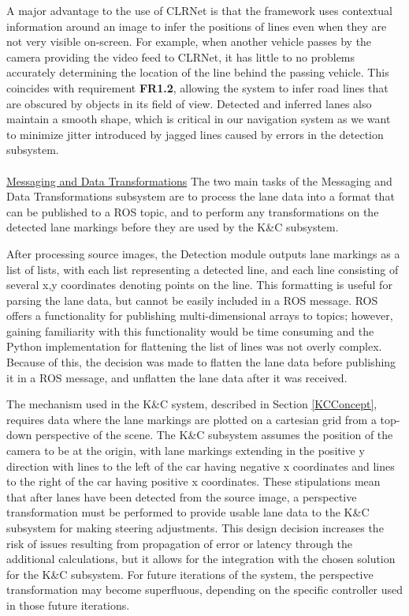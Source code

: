 \documentclass[titlepage,draft]{article}
\begin{document}
{A major advantage to the use of CLRNet is that the framework uses contextual information around an image to infer the positions
of lines even when they are not very visible on-screen.
For example, when another vehicle passes by the camera providing the video feed to CLRNet, it has little to no problems
accurately determining the location of the line behind the passing vehicle.
This coincides with requirement \textbf{FR1.2}, allowing the system to infer road lines that are obscured by objects in its field
of view.
Detected and inferred lanes also maintain a smooth shape, which is critical in our navigation system as we want to minimize
jitter introduced by jagged lines caused by errors in the detection subsystem.
\\~\\
\underline{Messaging and Data Transformations}
The two main tasks of the Messaging and Data Transformations subsystem are to process the lane data into a format that can be published to a ROS topic, and to perform any transformations on the detected lane markings before they are used by the K\&C subsystem.

After processing source images, the Detection module outputs lane markings as a list of lists, with each list representing a detected line, and each line consisting of several x,y coordinates denoting points on the line.  This formatting is useful for parsing the lane data, but cannot be easily included in a ROS message. ROS offers a functionality for publishing multi-dimensional arrays to topics; however, gaining familiarity with this functionality would be time consuming and the Python implementation for flattening the list of lines was not overly complex. Because of this, the decision was made to flatten the lane data before publishing it in a ROS message, and unflatten the lane data after it was received.

The mechanism used in the K\&C system, described in Section \ref{KCConcept}, requires data where the lane markings are plotted on a cartesian grid from a top-down perspective of the scene. The K\&C subsystem assumes the position of the camera to be at the origin, with lane markings extending in the positive y direction with lines to the left of the car having negative x coordinates and lines to the right of the car having positive x coordinates. These stipulations mean that after lanes have been detected from the source image, a perspective transformation must be performed to provide usable lane data to the K\&C subsystem for making steering adjustments. This design decision increases the risk of issues resulting from propagation of error or latency through the additional calculations, but it allows for the integration with the chosen solution for the K\&C subsystem. For future iterations of the system, the perspective transformation may become superfluous, depending on the specific controller used in those future iterations.


}
\end{document}
